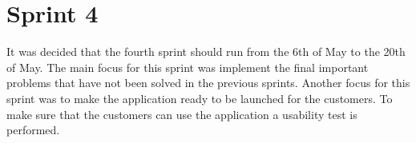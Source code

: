 \chapter{Sprint 4}
It was decided that the fourth sprint should run from the 6th of May to the 20th of May.
The main focus for this sprint was implement the final important problems that have not been solved in the previous sprints.
Another focus for this sprint was to make the application ready to be launched for the customers.
To make sure that the customers can use the application a usability test is performed.





